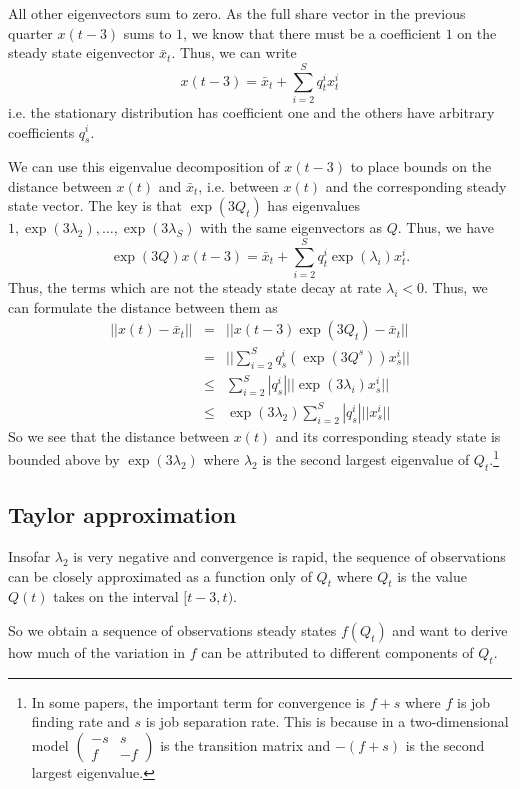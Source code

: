 All other eigenvectors sum to zero. As the full share vector in the previous quarter $x(t-3)$ sums to $1$, we know that there must be a coefficient $1$ on the steady state eigenvector $\bar x_t$. Thus, we can write 
\[
x(t-3)=\bar x_t + \sum_{i=2}^S q^i_t x_t^i
\]
i.e. the stationary distribution has coefficient one and the others have arbitrary coefficients $q^i_s$. 

We can use this eigenvalue decomposition of $x(t-3)$ to place bounds on the distance between $x(t)$ and $\bar x_t$, i.e. between $x(t)$ and the corresponding steady state vector. The key is that $\exp(3Q_t)$ has eigenvalues $1,\exp(3\lambda_2),\dots,\exp(3\lambda_S)$ with the same eigenvectors as $Q$. Thus, we have
\[
\exp(3Q)x(t-3)=\bar x_t + \sum_{i=2}^S q^i_t \exp(\lambda_i)x_t^i.
\]
Thus, the terms which are not the steady state decay at rate $\lambda_i<0$. Thus, we can formulate the distance between them as
\begin{eqnarray*}
||x(t)-\bar x_t|| &=& ||x(t-3)\exp(3Q_t)-\bar x_t||\\
&=& ||\sum_{i=2}^S q^i_s \left(\exp(3Q^s)\right) x_s^i||\\
&\le& \sum_{i=2}^S |q^i_s| ||\exp(3\lambda_i)x_s^i||\\
&\le& \exp(3\lambda_2) \sum_{i=2}^S |q^i_s| ||x_s^i||
\end{eqnarray*}
So we see that the distance between $x(t)$ and its corresponding steady state is bounded above by $\exp(3\lambda_2)$ where $\lambda_2$ is the second largest eigenvalue of $Q_t$.\footnote{In some papers, the important term for convergence is $f+s$ where $f$ is job finding rate and $s$ is job separation rate. This is because in a two-dimensional model $\left(\begin{array}{cc} -s & s \\ f & -f\end{array}\right)$ is the transition matrix and $-(f+s)$ is the second largest eigenvalue.}

\subsection{Taylor approximation}
Insofar $\lambda_2$ is very negative and convergence is rapid, the sequence of observations can be closely approximated as a function only of $Q_t$ where $Q_t$ is the value $Q(t)$ takes on the interval $[t-3,t)$. 

So we obtain a sequence of observations steady states $f(Q_t)$ and want to derive how much of the variation in $f$ can be attributed to different components of $Q_t$.

